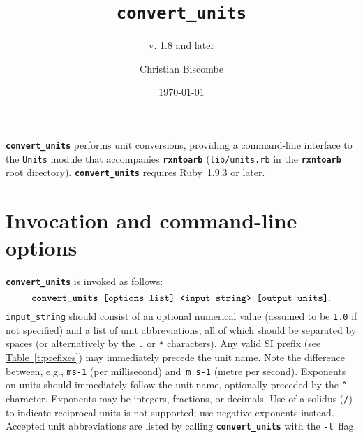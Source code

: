 \documentclass[fontsize=12pt,
               appendixprefix=true,
               captions=abovetable,
               numbers=noenddot,
              ]{scrartcl}
\newcommand{\eg}[1][\ ]{e.g.#1}
\newcommand{\tab}[1]{\hyperref[t:#1]{Table~\ref{t:#1}}}
\newcommand{\rxntoarb}{\texttt{\textbf{rxntoarb}}}
\newcommand{\convertunits}{\texttt{\textbf{convert\_units}}}
\begin{document}
\title{\convertunits}
\subtitle{v. 1.8 and later}
\author{Christian Biscombe}
\date{\large\today}
\maketitle

\convertunits{} performs unit conversions, providing a command-line interface to the \texttt{Units} module that accompanies \rxntoarb{} (\texttt{lib\slash{}units.rb} in the \rxntoarb{} root directory). \convertunits{} requires Ruby~1.9.3 or later.

\tableofcontents

\section{Invocation and command-line options}

\convertunits{} is invoked as follows:
%
\begin{equation*}
\convertunits{} \texttt{ [options\_list] <input\_string> [output\_units]}.
\end{equation*}
%
\texttt{input\_string} should consist of an optional numerical value (assumed to be \texttt{1.0} if not specified) and a list of unit abbreviations, all of which should be separated by spaces (or alternatively by the \texttt{.} or \texttt{*} characters). Any valid SI prefix (see \tab{prefixes}) may immediately precede the unit name. Note the difference between, \eg[], \texttt{ms-1} (per millisecond) and~\texttt{m~s-1} (metre per second). Exponents on units should immediately follow the unit name, optionally preceded by the \texttt{\^} character. Exponents may be integers, fractions, or decimals. Use of a solidus (\texttt{/}) to indicate reciprocal units is not supported; use negative exponents instead. Accepted unit abbreviations are listed by calling \convertunits{} with the \texttt{-l}~flag. 
\end{document}
